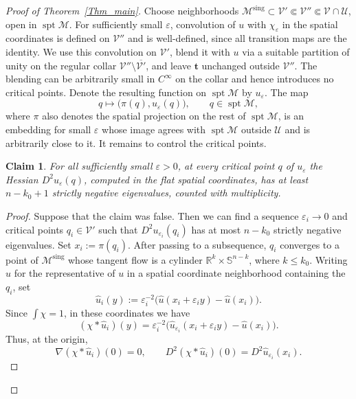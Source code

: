 \documentclass[10pt,a4paper]{amsart}
\newcommand{\IR}{\mathbb{R}}
\newcommand{\IS}{\mathbb{S}}
\newcommand{\UU}{\mathcal{U}}
\newcommand{\VV}{\mathcal{V}}
\newcommand{\MM}{\mathcal{M}}
\newcommand{\eps}{\varepsilon}
\newcommand{\ov}[1]{\overline{#1}}
\DeclareMathOperator{\sing}{sing}
\DeclareMathOperator{\spt}{spt}
\newtheorem{Claim}[equation]{Claim}
\numberwithin{equation}{section}
\begin{document}
\begin{proof}[Proof of Theorem~\ref{Thm_main}]
Choose neighborhoods $\MM^{\sing}\subset\VV'\Subset\VV''\Subset\VV\cap\UU$, open in $\spt\MM$.
For sufficiently small $\eps$, convolution of $u$ with $\chi_\eps$ in the spatial coordinates is defined on $\VV''$ and is well-defined, since all transition maps are the identity.
We use this convolution on $\VV'$, blend it with $u$ via a suitable partition of unity on the regular collar $\VV''\setminus\ov{\VV'}$, and leave $\mathbf{t}$ unchanged outside $\VV''$.
The blending can be arbitrarily small in $C^\infty$ on the collar and hence introduces no critical points.
Denote the resulting function on $\spt\MM$ by $u_\eps$.
The map
\[
 q\longmapsto\big(\pi(q),u_\eps(q)\big),\qquad q\in\spt\MM,
\tag{3.2}\label{eq_smoothed_embedding}
\]
where $\pi$ also denotes the spatial projection on the rest of $\spt\MM$,
is an embedding for small $\eps$ whose image agrees with $\spt\MM$ outside $\UU$ and is arbitrarily close to it.
It remains to control the critical points.

\begin{Claim}\label{Cl_spectral}
For all sufficiently small $\eps>0$, at every critical point $q$ of $u_\eps$ the Hessian $D^2u_\eps(q)$, computed in the flat spatial coordinates, has at least $n-k_0+1$ strictly negative eigenvalues, counted with multiplicity.
\end{Claim}

\begin{proof}
Suppose that the claim was false.
Then we can find a sequence $\eps_i\to0$ and critical points $q_i\in\VV'$ such that $D^2u_{\eps_i}(q_i)$ has at most $n-k_0$ strictly negative eigenvalues.
Set $x_i:=\pi(q_i)$.
After passing to a subsequence, $q_i$ converges to a point of $\MM^{\sing}$ whose tangent flow is a cylinder $\IR^k\times\IS^{n-k}$, where $k\leq k_0$.
Writing $\hat u$ for the representative of $u$ in a spatial coordinate neighborhood containing the $q_i$, set
\[
 \hat u_i(y):=\eps_i^{-2}\big(\hat u(x_i+\eps_i y)-\hat u(x_i)\big).
\tag{3.3}\label{eq_rescale}
\]
Since $\int\chi=1$, in these coordinates we have
\[
 (\chi*\hat u_i)(y)=\eps_i^{-2}
 \big(\hat u_{\eps_i}(x_i+\eps_i y)-\hat u(x_i)\big).
\]
Thus, at the origin,
\[
 \nabla(\chi*\hat u_i)(0)=0,
 \qquad
 D^2(\chi*\hat u_i)(0)=D^2\hat u_{\eps_i}(x_i).
\tag{3.4}\label{eq_rescaled_critical}
\]


\end{proof}
\end{proof}
\end{document}
